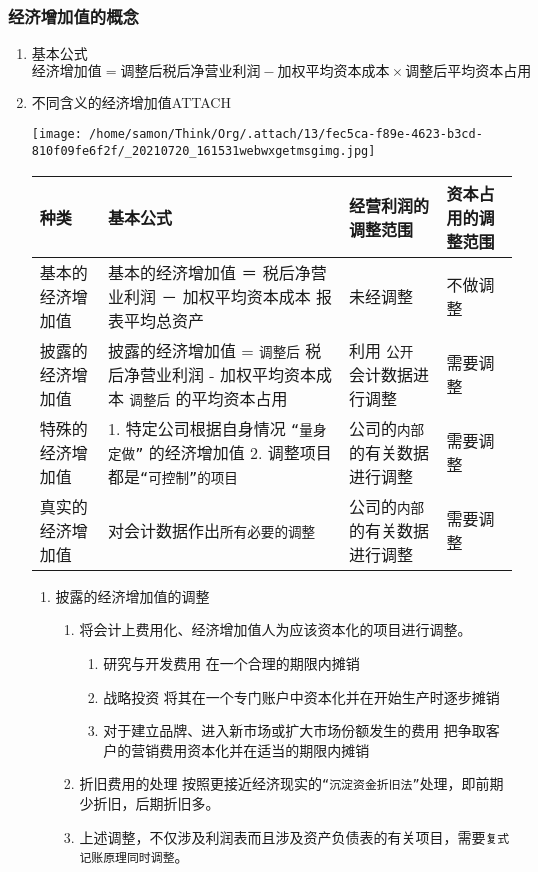 \documentclass[11pt]{article}
\begin{document}
\subsubsection{经济增加值的概念}
\label{sec:org3599827}
\begin{enumerate}
\item 基本公式
\label{sec:org24a383a}
\(经济增加值 = 调整后税后净营业利润 - 加权平均资本成本 \times 调整后平均资本占用\)
\item 不同含义的经济增加值\hfill{}\textsc{ATTACH}
\label{sec:orgdc3fca2}
\begin{center}
\texttt{[image: /home/samon/Think/Org/.attach/13/fec5ca-f89e-4623-b3cd-810f09fe6f2f/\_20210720\_161531webwxgetmsgimg.jpg]}
\end{center}

\begin{center}
\begin{tabular}{llll}
种类 & 基本公式 & 经营利润的调整范围 & 资本占用的调整范围\\
\hline
基本的经济增加值 & 基本的经济增加值 ＝ 税后净营业利润 － 加权平均资本成本 \texttimes{} 报表平均总资产 & 未经调整 & 不做调整\\
披露的经济增加值 & 披露的经济增加值 = \texttt{调整后} 税后净营业利润 - 加权平均资本成本 \texttimes{} \texttt{调整后} 的平均资本占用 & 利用 \texttt{公开} 会计数据进行调整 & 需要调整\\
特殊的经济增加值 & 1. 特定公司根据自身情况 \texttt{“量身定做”} 的经济增加值 2. 调整项目都是\texttt{“可控制”的项目} & 公司的\texttt{内部}的有关数据进行调整 & 需要调整\\
真实的经济增加值 & 对会计数据作出\texttt{所有必要的调整} & 公司的\texttt{内部}的有关数据进行调整 & 需要调整\\
\end{tabular}
\end{center}
\begin{enumerate}
\item 披露的经济增加值的调整
\label{sec:orgc203798}
\begin{enumerate}
\item 将会计上费用化、经济增加值人为应该资本化的项目进行调整。
\begin{enumerate}
\item 研究与开发费用
在一个合理的期限内摊销
\item 战略投资
将其在一个专门账户中资本化并在开始生产时逐步摊销
\item 对于建立品牌、进入新市场或扩大市场份额发生的费用
把争取客户的营销费用资本化并在适当的期限内摊销
\end{enumerate}
\item 折旧费用的处理
按照更接近经济现实的\texttt{“沉淀资金折旧法”}处理，即前期少折旧，后期折旧多。
\item 上述调整，不仅涉及利润表而且涉及资产负债表的有关项目，需要\texttt{复式记账原理同时调整}。
\end{enumerate}
\end{enumerate}
\end{enumerate}
\end{document}
